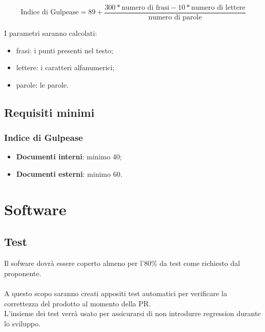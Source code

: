 \documentclass[a4paper, 12pt]{article}
\begin{document}
\[ \text{Indice di Gulpease} = 89 + \frac{300*\text{numero di frasi} - 10*\text{numero di lettere}}{\text{numero di parole}} \]

I parametri saranno calcolati:
\begin{itemize}
	\item frasi: i punti presenti nel testo;
	\item lettere: i caratteri alfanumerici;
	\item parole: le parole.
\end{itemize}

\subsection{Requisiti minimi}
\subsubsection{Indice di Gulpease}
\begin{itemize}
	\item \textbf{Documenti interni}: minimo 40;
	\item \textbf{Documenti esterni}: minimo 60.
\end{itemize}

\section{Software}
\subsection{Test}
Il sofware dovrà essere coperto almeno per l'80\% da test come richiesto dal proponente.\\\\
A questo scopo saranno creati appositi test automatici per verificare la correttezza del prodotto al momento della PR.\\
L'insieme dei test verrà usato per assicurarsi di non introdurre regression durante lo sviluppo.
\end{document}
